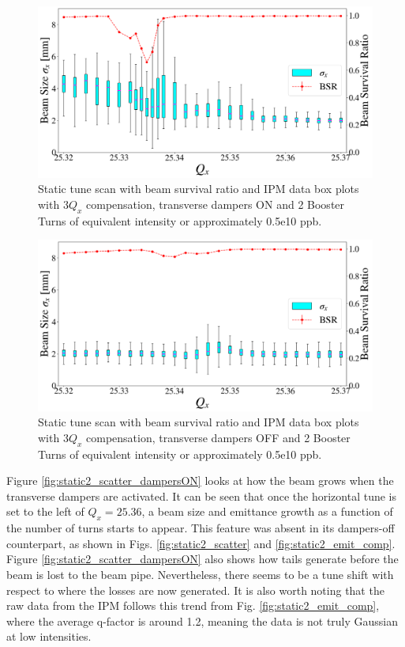 \newpage
\begin{figure}[H]
    \centering
    \includegraphics[width=\columnwidth]{chapter6/static2turns_ipm_dampersON.png}
    \caption{Static tune scan with beam survival ratio and IPM data box plots with $3Q_x$ compensation, transverse dampers ON and 2 Booster Turns of equivalent intensity or approximately 0.5e10 ppb.}
    \label{fig:static2_dampersON}
\end{figure}

\begin{figure}[H]
    \centering
    \includegraphics[width=\columnwidth]{chapter6/static2turns_ipm_dampersOFF.png}
    \caption{Static tune scan with beam survival ratio and IPM data box plots with $3Q_x$ compensation, transverse dampers OFF and 2 Booster Turns of equivalent intensity or approximately 0.5e10 ppb.}
    \label{fig:static2_dampersOFF}
\end{figure}
\newpage

Figure \ref{fig:static2_scatter_dampersON} looks at how the beam grows when the transverse dampers are activated. It can be seen that once the horizontal tune is set to the left of $Q_x=25.36$, a beam size and emittance growth as a function of the number of turns starts to appear. This feature was absent in its dampers-off counterpart, as shown in Figs. \ref{fig:static2_scatter} and \ref{fig:static2_emit_comp}. Figure \ref{fig:static2_scatter_dampersON} also shows how tails generate before the beam is lost to the beam pipe. Nevertheless, there seems to be a tune shift with respect to where the losses are now generated. It is also worth noting that the raw data from the IPM follows this trend from Fig. \ref{fig:static2_emit_comp}, where the average q-factor is around 1.2, meaning the data is not truly Gaussian at low intensities.

